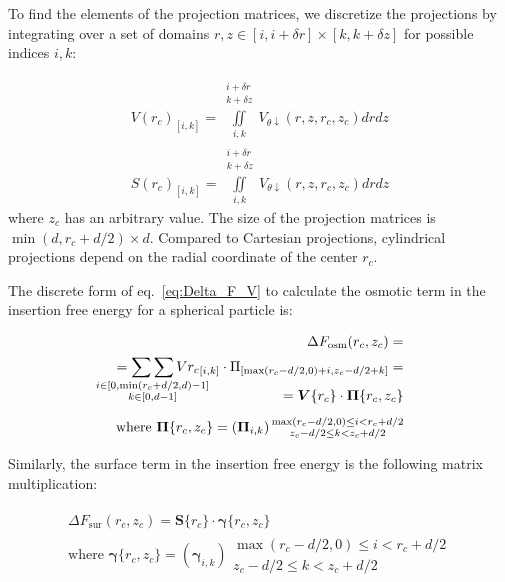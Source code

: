 \documentclass[10pt, a4paper]{article}
\begin{document}
\begin{multicols}{2}
To find the elements of the projection matrices, we discretize the projections by integrating over a set of domains $r, z \in [i, i + \delta r] \times [k, k + \delta z]$ for possible indices $i, k$:

\begin{eqnarray}
    V(r_c)_{[i, k]} = \iint \limits_{i, k}^{\substack{i+\delta r\\ k+\delta z}} V_{\theta \downarrow} (r, z, r_c, z_c) dr dz
    \\
    S(r_c)_{[i, k]} = \iint \limits_{i, k}^{\substack{i+\delta r\\ k+\delta z}} V_{\theta \downarrow} (r, z, r_c, z_c) dr dz
\end{eqnarray}
where $z_c$ has an arbitrary value.
The size of the projection matrices is $\min(d, r_c + d/2) \times d$.
Compared to Cartesian projections, cylindrical projections depend on the radial coordinate of the center $r_c$.

The discrete form of eq.~\ref{eq:Delta_F_V} to calculate the osmotic term in the insertion free energy for a spherical particle is:

\begin{eqnarray}
    \begin{split}
        \Delta F_{\textrm{osm}}(r_c, z_c) =\\
        = \mathop{\sum\sum}_{\mathclap{\substack{i \in [0, \min(r_c+d/2,d)-1] \\ k \in [0, d-1]}}} V{r_c}_{[i, k]} \cdot \Pi_{[\max(r_c-d/2,0)+i, z_c-d/2+k]} =\\[-15pt]
        = \bm{V}\{r_c\} \cdot \bm{\Pi}\{r_c, z_c\} \\[5pt]
        \text{where } \bm{\Pi}\{r_c,z_c\} =\left(\bm{\Pi}_{i,k}\right) {\substack{\max(r_c-d/2,0) \le i < r_c+d/2 \\ z_c-d/2 \le k < z_c+d/2}}
    \end{split}
\end{eqnarray}

Similarly, the surface term in the insertion free energy is the following matrix multiplication:

\begin{eqnarray}
    \begin{split}
        \Delta F_{\textrm{sur}}(r_c, z_c) = \bm{S}\{r_c\} \cdot \bm{\gamma}\{r_c, z_c\} \\[5pt]
        \text{where } \bm{\gamma}\{r_c,z_c\} =\left(\bm{\gamma}_{i,k}\right) {\substack{\max(r_c-d/2,0) \le i < r_c+d/2 \\ z_c-d/2 \le k < z_c+d/2}}
    \end{split}
\end{eqnarray}


\end{multicols}
\end{document}
